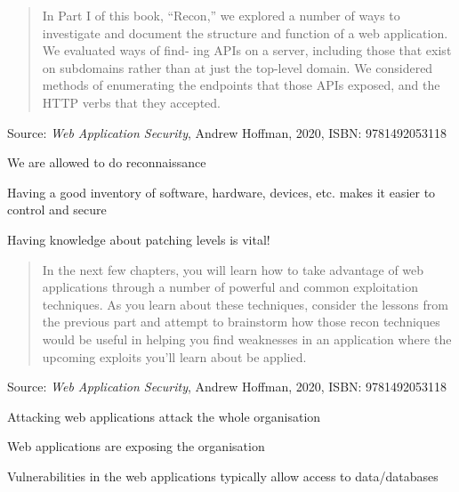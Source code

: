 \documentclass[Screen16to9,17pt]{foils}
\begin{document}


\begin{quote}
  In Part I of this book, “Recon,” we explored a number of ways to investigate and
  document the structure and function of a web application. We evaluated ways of find‐
  ing APIs on a server, including those that exist on subdomains rather than at just the
  top-level domain. We considered methods of enumerating the endpoints that those
  APIs exposed, and the HTTP verbs that they accepted.
\end{quote}
Source: \emph{Web Application Security}, Andrew Hoffman, 2020, ISBN: 9781492053118


\begin{list2}
\item We are allowed to do reconnaissance
\item Having a good inventory of software, hardware, devices, etc. makes it easier to control and secure
\item Having knowledge about patching levels is vital!
\end{list2}




\begin{quote}
  In the next few chapters, you will learn how to take advantage of web applications
  through a number of powerful and common exploitation techniques. As you learn
  about these techniques, consider the lessons from the previous part and attempt to
  brainstorm how those recon techniques would be useful in helping you find weaknesses in an application where the upcoming exploits you’ll learn about be applied.
\end{quote}
Source: \emph{Web Application Security}, Andrew Hoffman, 2020, ISBN: 9781492053118

\begin{list2}
\item Attacking web applications attack the whole organisation
\item Web applications are exposing the organisation
\item Vulnerabilities in the web applications typically allow access to data/databases
\end{list2}



\end{document}
